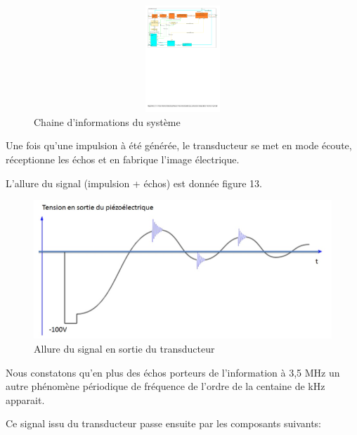 \documentclass[12pt]{article}
\begin{document}
\begin{figure}[!h]
  \hspace{-60pt}
  \includegraphics[width=21cm,height=4cm,trim=0cm 25.5cm 0cm 1.5cm, clip=true]{Images_Rapport/ibd_pdf}
  
  
  \caption{Chaine d'informations du système}
  
\end{figure}

Une fois qu'une impulsion à été générée, le transducteur se met en mode écoute, réceptionne les échos et en fabrique l'image électrique.\par
L'allure du signal (impulsion + échos) est donnée figure 13.

\begin{figure}[!h]
  \centering
  \includegraphics[width=14cm,trim=0cm 0cm 0cm 0cm, clip=true]{Images_Rapport/allure}
  
  
  \caption{Allure du signal en sortie du transducteur}
  
\end{figure}

Nous constatons qu'en plus des échos porteurs de l'information à 3,5 MHz un autre phénomène périodique de fréquence de l'ordre de la centaine de kHz apparait.\par
\vspace{20pt}

Ce signal issu du transducteur passe ensuite par les composants suivants:\par
\vspace{10pt}
\end{document}

